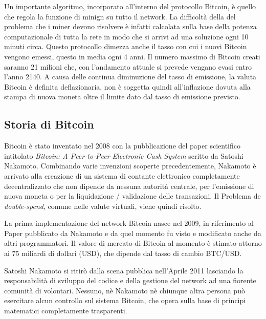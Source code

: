 Un importante algoritmo, incorporato all'interno del protocollo Bitcoin, è quello che regola la funzione di minign su tutto il network. La difficoltà della del problema che i miner devono risolvere è infatti calcolata sulla base della potenza computazionale di tutta la rete in modo che si arrivi ad una soluzione ogni 10 minuti circa. Questo protocollo dimezza anche il tasso con cui i nuovi Bitcoin vengono emessi, questo in media ogni 4 anni. Il numero massimo di Bitcoin creati saranno 21 milioni che, con l'andamento attuale si prevede vengano evasi entro l'anno 2140. A causa delle continua diminuzione del tasso di emissione, la valuta Bitcoin è definita deflazionaria, non è soggetta quindi all'inflazione dovuta alla stampa di nuova moneta oltre il limite dato dal tasso di emissione previsto.

\subsection{Storia di Bitcoin}
Bitcoin è stato inventato nel 2008 con la pubblicazione del paper scientifico intitolato \textit{Bitcoin: A Peer-to-Peer Electronic Cash System} \cite{paper-bitcoin:satoshi} scritto da Satoshi Nakamoto. Combinando varie invenzioni scoperte precedentemente, Nakamoto è arrivato alla creazione di un sistema di contante elettronico completamente decentralizzato che non dipende da nessuna autorità centrale, per l'emissione di nuova moneta o per la liquidazione / validazione delle transazioni. Il Problema de \textit{double-spend}, comune nelle valute virtuali, viene quindi risolto. 

La prima implementazione del network Bitcoin nasce nel 2009, in riferimento al Paper pubblicato da Nakamoto \cite{paper-bitcoin:satoshi} e da quel momento fu visto e modificato anche da altri programmatori. Il valore di mercato di Bitcoin al momento è stimato attorno ai 75 miliardi di dollari (USD), che dipende dal tasso di cambio BTC/USD.

Satoshi Nakamoto si ritirò dalla scena pubblica nell'Aprile 2011 lasciando la responsabilità di sviluppo del codice e della gestione del network ad una fiorente comunità di volontari. Nessuno, nè Nakamoto nè chiunque altra persona può esercitare alcun controllo sul sistema Bitcoin, che opera sulla base di principi matematici completamente trasparenti.

